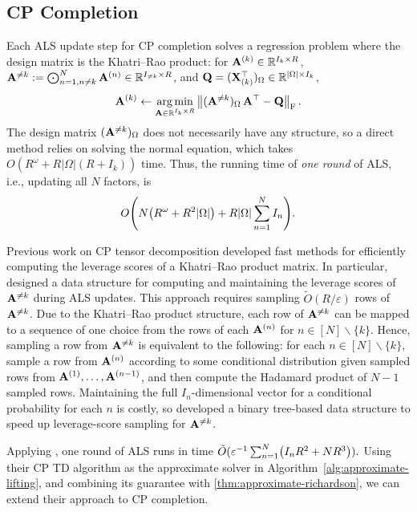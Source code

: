 \subsection{CP Completion}
\label{subsec:CP-completion}
Each ALS update step for CP completion solves a regression problem where the design matrix is the Khatri--Rao product:
for $\mathbf{A}^{(k)} \in \mathbb{R}^{I_k \times R}$,
$\mathbf{A}^{\neq k} := \bigodot_{n=1,n\neq k}^N \mathbf{A}^{(n)} \in \mathbb{R}^{I_{\neq k}\times R}$,
and $\mathbf{Q} = (\mathbf{X}^\top_{(k)})_\Omega \in \mathbb{R}^{|\Omega| \times I_k}$,
\[
    \mathbf{A}^{(k)}
    \gets
    \operatorname*{arg\,min}_{\mathbf{A} \in \mathbb{R}^{I_k \times R}} \, \bigl\lVert  (\mathbf{A}^{\neq k})_\Omega \,\mathbf{A}^\top - \mathbf{Q} \bigr\rVert_{\textnormal{F}}\,.
\]
The design matrix $(\mathbf{A}^{\neq k})_\Omega$ does not necessarily have any structure,
so a direct method relies on solving the normal equation, which takes $O(R^\omega +R |\Omega|(R+I_k))$ time.
Thus, the running time of \emph{one round} of ALS, i.e., updating all $N$ factors,
is
\[
    O\parens*{N\parens*{R^\omega +R^2 |\Omega|}+ R |\Omega|\sum_{n=1}^N I_n}.
\]

Previous work on CP tensor decomposition \citep{cheng2016spals, larsen2022practical, bharadwaj2023fast}
developed fast methods for efficiently computing the leverage scores of a Khatri--Rao product matrix.
In particular, \citet{bharadwaj2023fast} designed a data structure for computing and maintaining the
leverage scores of $\mathbf{A}^{\neq k}$ during ALS updates. 
This approach requires sampling $\tilde{O}(R/\varepsilon)$ rows of $\mathbf{A}^{\neq k}$.
Due to the Khatri--Rao product structure, each row of $\mathbf{A}^{\neq k}$ can be mapped to a sequence of one choice from the rows of each $\mathbf{A}^{(n)}$ for $n\in [N]\backslash \{k\}$.
Hence, sampling a row from $\mathbf{A}^{\neq k}$ is equivalent to the following:
for each $n \in [N]\backslash\{k\}$, sample a row from $\mathbf{A}^{(n)}$ according to some conditional distribution given sampled rows from $\mathbf{A}^{(1)}, \dots, \mathbf{A}^{(n-1)}$, and then compute the Hadamard product of $N-1$ sampled rows.
Maintaining the full $I_n$-dimensional vector for a conditional probability for each $n$ is costly,
so \citet{bharadwaj2023fast} developed a binary tree-based data structure to speed up leverage-score sampling for $\mathbf{A}^{\neq k}$.

Applying \citet[Corollary 3.3]{bharadwaj2023fast}, one round of ALS runs in time
$
    \tilde{O} \parens{ \varepsilon^{-1} \sum_{n=1}^N \parens*{ I_n R^2 + NR^3} }.
$
Using their CP TD algorithm as the approximate solver in Algorithm~\ref{alg:approximate-lifting}, and combining its guarantee with \cref{thm:approximate-richardson},
we can extend their approach to CP completion.

